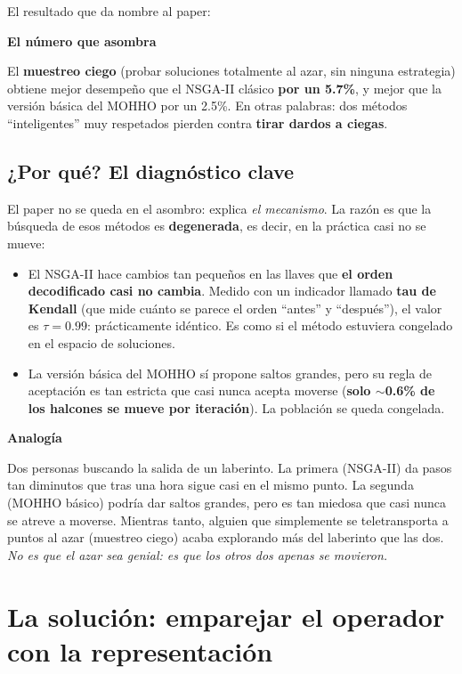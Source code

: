 \documentclass[11pt]{article}
\newcommand{\cajacolor}{cajadato}
\newenvironment{caja}[2]{%
  \par\medskip\noindent
  \renewcommand{\cajacolor}{#1}%
  \begin{lrbox}{\cajabox}%
  \begin{minipage}{\dimexpr\linewidth-2\fboxsep-1.2em\relax}%
  \setlength{\parskip}{0.5em}%
  {\bfseries\color{acento2}#2}\par\smallskip}
  {\end{minipage}%
  \end{lrbox}%
  \setlength{\fboxsep}{0.6em}%
  \colorbox{\cajacolor}{\usebox{\cajabox}}\par\medskip}
\newcommand{\analogia}[1]{\begin{caja}{cajaanalogia}{Analogía}#1\end{caja}}
\newcommand{\term}[1]{\textbf{\color{acento}#1}}
\begin{document}
El resultado que da nombre al paper:

\begin{caja}{cajadato}{El número que asombra}
El \textbf{muestreo ciego} (probar soluciones totalmente al azar, sin ninguna estrategia) obtiene mejor desempeño que el NSGA-II clásico \textbf{por un 5.7\%}, y mejor que la versión básica del MOHHO por un 2.5\%. En otras palabras: dos métodos ``inteligentes'' muy respetados pierden contra \textbf{tirar dardos a ciegas}.
\end{caja}

\subsection{¿Por qué? El diagnóstico clave}

El paper no se queda en el asombro: explica \emph{el mecanismo}. La razón es que la búsqueda de esos métodos es \term{degenerada}, es decir, en la práctica casi no se mueve:

\begin{itemize}[leftmargin=1.4em]
  \item El NSGA-II hace cambios tan pequeños en las llaves que \textbf{el orden decodificado casi no cambia}. Medido con un indicador llamado \term{tau de Kendall} (que mide cuánto se parece el orden ``antes'' y ``después''), el valor es $\tau = 0.99$: prácticamente idéntico. Es como si el método estuviera congelado en el espacio de soluciones.
  \item La versión básica del MOHHO sí propone saltos grandes, pero su regla de aceptación es tan estricta que casi nunca acepta moverse (\textbf{solo $\sim$0.6\% de los halcones se mueve por iteración}). La población se queda congelada.
\end{itemize}

\analogia{
Dos personas buscando la salida de un laberinto. La primera (NSGA-II) da pasos tan diminutos que tras una hora sigue casi en el mismo punto. La segunda (MOHHO básico) podría dar saltos grandes, pero es tan miedosa que casi nunca se atreve a moverse. Mientras tanto, alguien que simplemente se teletransporta a puntos al azar (muestreo ciego) acaba explorando más del laberinto que las dos. \emph{No es que el azar sea genial: es que los otros dos apenas se movieron.}
}

\section{La solución: emparejar el operador con la representación}
\end{document}
